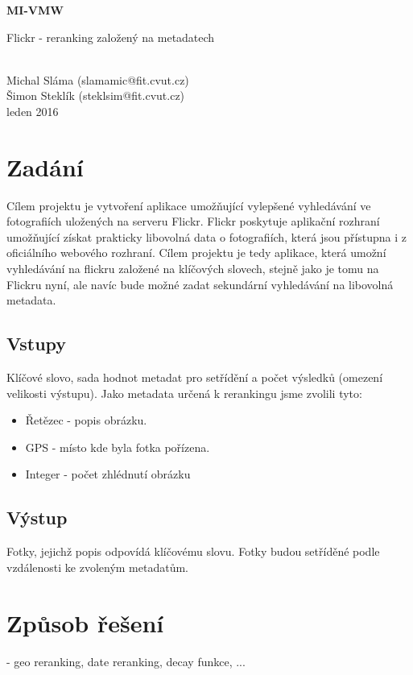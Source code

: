 \documentclass[12pt,oneside,a4paper]{article}
\begin{document}
\begin{center}
\bf MI-VMW\\[2mm]
    \begin{Large}Flickr - reranking založený na metadatech\end{Large}\\[3mm]
       Michal Sláma (slamamic@fit.cvut.cz)\\
       Šimon Steklík (steklsim@fit.cvut.cz)\\
leden 2016
\end{center}

\section{Zadání}
Cílem projektu je vytvoření aplikace umožňující vylepšené vyhledávání ve fotografiích uložených na serveru
Flickr. Flickr poskytuje aplikační rozhraní umožňující získat prakticky libovolná data o fotografiích, která jsou
přístupna i z oficiálního webového rozhraní. Cílem projektu je tedy aplikace, která umožní vyhledávání na
flickru založené na klíčových slovech, stejně jako je tomu na Flickru nyní, ale navíc bude možné zadat
sekundární vyhledávání na libovolná metadata.

\subsection{Vstupy}
Klíčové slovo, sada hodnot metadat pro setřídění a počet výsledků (omezení velikosti výstupu).
Jako metadata určená k rerankingu jsme zvolili tyto:
\begin{itemize}
	\item Řetězec - popis obrázku.
	\item GPS - místo kde byla fotka pořízena.
	\item Integer - počet zhlédnutí obrázku
\end{itemize}

\subsection{Výstup}
Fotky, jejichž popis odpovídá klíčovému slovu. Fotky budou setříděné podle vzdálenosti ke zvoleným
metadatům.

\section{Způsob řešení}
- geo reranking, date reranking, decay funkce, ...
\end{document}
